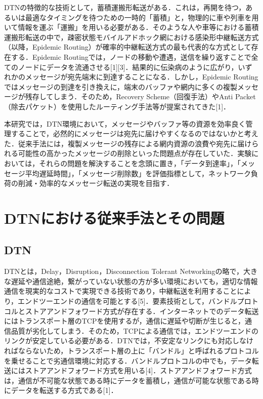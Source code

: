 \documentclass[11pt]{icsthesis}
\begin{document}
DTNの特徴的な技術として，蓄積運搬形転送がある．これは，再開を待つ，あるいは最適なタイミングを待つための一時的「蓄積」と，物理的に車や列車を用いて情報を運ぶ「運搬」を用いる必要がある．そのような人や車等における蓄積運搬形転送の中で，疎密状態モバイルアドホック網における感染形中継転送方式（以降，Epidemic Routing）が確率的中継転送方式の最も代表的な方式として存在する．Epidemic Routingでは，ノードの移動や遭遇，送信を繰り返すことで全てのノードにデータを流通させる[1][3]．結果的に伝染病のように広がり，いずれかのメッセージが宛先端末に到達することになる．しかし，Epidemic Routingではメッセージの到達を引き換えに，端末のバッファや網内に多くの複製メッセージが残存してしまう．そのため，Recovery Scheme（回復手法）やAnti Packet（除去パケット）を使用したルーティング手法等が提案されてきた[1]．

本研究では，DTN環境において，メッセージやバッファ等の資源を効率良く管理することで，必然的にメッセージは宛先に届けやすくなるのではないかと考えた．従来手法には，複製メッセージの残存による網内資源の浪費や宛先に届けられる可能性の高かったメッセージの削除といった問題点が存在していた．実験においては，それらの問題を解決することを念頭に置き，「データ到達率」，「メッセージ平均遅延時間」，「メッセージ削除数」を評価指標として，ネットワーク負荷の削減・効率的なメッセージ転送の実現を目指す．

\chapter{DTNにおける従来手法とその問題}
\section{DTN}
DTNとは，Delay，Disruption，Disconnection Tolerant Networkingの略で，大きな遅延や通信途絶，繋がっていない状態の方が多い環境においても，適切な情報通信を現実的なコストで実現できる技術であり，中継転送を利用することにより，エンドツーエンドの通信を可能とする[5]．要素技術として，バンドルプロトコルとストアアンドフォワード方式が存在する．インターネットでのデータ転送にはトランスポート層のTCPを使用するが，通信に遅延や切断が生じると，通信品質が劣化してしまう．そのため，TCPによる通信では，エンドツーエンドのリンクが安定している必要がある．DTNでは，不安定なリンクにも対応しなければならないため，トランスポート層の上に「バンドル」と呼ばれるプロトコルを乗せることで劣通信環境に対応する．バンドルプロトコルの中でも，データ転送にはストアアンドフォワード方式を用いる[4]．ストアアンドフォワード方式は，通信が不可能な状態である時にデータを蓄積し，通信が可能な状態である時にデータを転送する方式である[1]．
\end{document}

